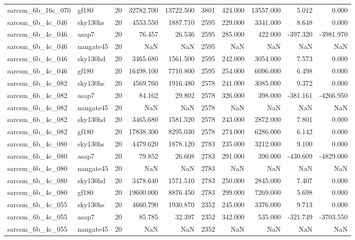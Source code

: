 \documentclass{article}
\begin{document}
\begin{longtable}{llrrrrrrrr}
sarcsm\_6b\_16c\_070 & gf180 & 20 & 32782.700 & 13722.500 & 3801 & 424.000 & 13557.000 & 5.012 & 0.000 \\
sarcsm\_6b\_4c\_046 & sky130hs & 20 & 4553.550 & 1887.710 & 2595 & 229.000 & 3341.000 & 8.648 & 0.000 \\
sarcsm\_6b\_4c\_046 & asap7 & 20 & 76.457 & 26.536 & 2595 & 285.000 & 422.000 & -397.320 & -3981.970 \\
sarcsm\_6b\_4c\_046 & nangate45 & 20 & NaN & NaN & 2595 & NaN & NaN & NaN & NaN \\
sarcsm\_6b\_4c\_046 & sky130hd & 20 & 3465.680 & 1561.500 & 2595 & 242.000 & 3054.000 & 7.573 & 0.000 \\
sarcsm\_6b\_4c\_046 & gf180 & 20 & 16498.100 & 7710.800 & 2595 & 254.000 & 6096.000 & 6.498 & 0.000 \\
sarcsm\_6b\_4c\_082 & sky130hs & 20 & 4569.760 & 1916.480 & 2578 & 241.000 & 3085.000 & 9.372 & 0.000 \\
sarcsm\_6b\_4c\_082 & asap7 & 20 & 84.162 & 29.802 & 2578 & 326.000 & 398.000 & -381.161 & -4266.950 \\
sarcsm\_6b\_4c\_082 & nangate45 & 20 & NaN & NaN & 2578 & NaN & NaN & NaN & NaN \\
sarcsm\_6b\_4c\_082 & sky130hd & 20 & 3465.680 & 1581.520 & 2578 & 243.000 & 2872.000 & 7.801 & 0.000 \\
sarcsm\_6b\_4c\_082 & gf180 & 20 & 17838.300 & 8295.030 & 2578 & 274.000 & 6286.000 & 6.142 & 0.000 \\
sarcsm\_6b\_4c\_080 & sky130hs & 20 & 4479.620 & 1878.120 & 2783 & 235.000 & 3212.000 & 9.100 & 0.000 \\
sarcsm\_6b\_4c\_080 & asap7 & 20 & 79.852 & 26.608 & 2783 & 291.000 & 390.000 & -430.609 & -4829.000 \\
sarcsm\_6b\_4c\_080 & nangate45 & 20 & NaN & NaN & 2783 & NaN & NaN & NaN & NaN \\
sarcsm\_6b\_4c\_080 & sky130hd & 20 & 3478.640 & 1571.510 & 2783 & 250.000 & 2845.000 & 7.407 & 0.000 \\
sarcsm\_6b\_4c\_080 & gf180 & 20 & 19600.000 & 8876.450 & 2783 & 299.000 & 7269.000 & 5.698 & 0.000 \\
sarcsm\_6b\_4c\_055 & sky130hs & 20 & 4660.790 & 1930.870 & 2352 & 245.000 & 3376.000 & 9.713 & 0.000 \\
sarcsm\_6b\_4c\_055 & asap7 & 20 & 85.785 & 32.397 & 2352 & 342.000 & 535.000 & -321.749 & -3703.550 \\
sarcsm\_6b\_4c\_055 & nangate45 & 20 & NaN & NaN & 2352 & NaN & NaN & NaN & NaN \\

\end{longtable}
\end{document}
